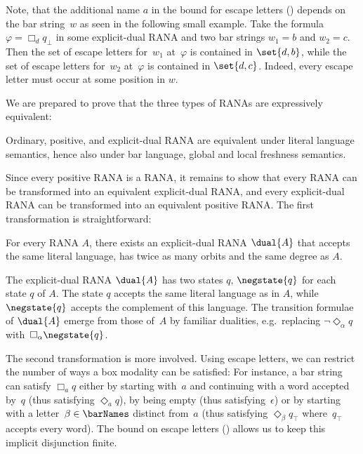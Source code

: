\documentclass[10pt, final, conference, a4paper, twocolumn]{IEEEtran}
\begin{document}
\begin{example}\label{rem:boundEscapes:Example}
  Note, that the additional name $a$ in the bound for escape letters
  () depends on the bar string~$w$ as seen in the
  following small example. Take the formula \mbox{$\varphi = \Box_d q_\bot$} in some
  explicit-dual RANA and two bar strings $w_1 = b$ and $w_2 = c$. Then the
  set of escape letters for~$w_1$ at~$\varphi$ is contained in $\set{d, b}$,
  while the set of escape letters for~$w_2$ at~$\varphi$ is contained in $\set{d, c}$.
  Indeed, every escape letter must occur at some position in $w$.
\end{example}

We are prepared to prove that the three types of RANAs are expressively equivalent:

\begin{theo}\label{thm:equivTypes} Ordinary,
  positive, and explicit-dual RANA are equivalent under
  literal language semantics, hence also under bar language, global and local
  freshness semantics.
\end{theo}

Since every positive RANA is a RANA, it remains to show that every RANA can be transformed into an equivalent explicit-dual RANA, and every explicit-dual RANA can be transformed into an equivalent positive RANA. The first transformation is straightforward:

\begin{prop}\label{lem:constr01}
For every RANA $A$, there exists an explicit-dual RANA $\dual{A}$ that accepts the same
  literal language, has twice as many orbits and the same degree as $A$.
\end{prop}
\begin{IEEEproof}
  The explicit-dual RANA $\dual{A}$ has two states $q$, $\negstate{q}$
  for each state $q$ of $A$. The state $q$ accepts the same literal
  language as in $A$, while $\negstate{q}$ accepts the complement of
  this language.  The transition formulae of $\dual{A}$ emerge
  from those of~$A$ by familiar dualities, e.g.~replacing
  $\neg\Diamond_\alpha q$ with~$\Box_\alpha \negstate{q}$.
\end{IEEEproof}

The second transformation is more involved.
Using escape letters, we can restrict the number of ways a box modality can be
satisfied: For instance, a bar string can satisfy $\Box_a q$ either by starting
with~$a$ and continuing with a word accepted by~$q$ (thus satisfying
$\Diamond_a q$), by being empty (thus satisfying~$\epsilon$) or by
starting with a letter~$\beta\in\barNames$ distinct from~$a$ (thus
satisfying $\Diamond_\beta q_\top$ where~$q_\top$ accepts every word).
The bound on escape letters () allows us to keep this
implicit disjunction finite.
\end{document}
